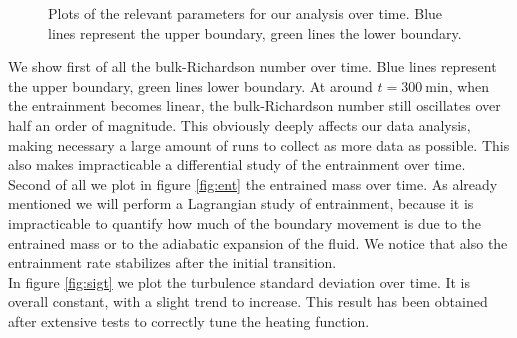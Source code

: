 \begin{figure}[t!]
	\hfill
  \centering
      \hfill
	\caption{Plots of the relevant parameters for our analysis over time. Blue lines represent the upper boundary, green lines the lower boundary.}
	  \label{fig:2dsingle}
  \end{figure}
We show first of all the bulk-Richardson number over time. Blue lines represent the upper boundary, green lines lower boundary. At around $t=\mathrm{300 \ min}$, when the entrainment becomes linear, the bulk-Richardson number still oscillates over half an order of magnitude. This obviously deeply affects our data analysis, making necessary a large amount of runs to collect as more data as possible. This also makes impracticable a differential study of the entrainment over time. \\
Second of all we plot in figure \ref{fig:ent} the entrained mass over time. As already mentioned we will perform a Lagrangian study of entrainment, because it is impracticable to quantify how much of the boundary movement is due to the entrained mass or to the adiabatic expansion of the fluid. We notice that also the entrainment rate stabilizes after the initial transition. \\
  In figure \ref{fig:sigt} we plot the turbulence standard deviation over time. It is overall constant, with a slight trend to increase. This result has been obtained after extensive tests to correctly tune the heating function.\\

